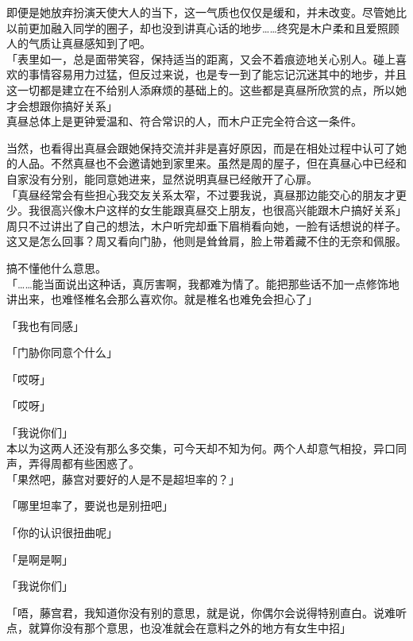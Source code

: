 即便是她放弃扮演天使大人的当下，这一气质也仅仅是缓和，并未改变。尽管她比以前更加融入同学的圈子，却也没到讲真心话的地步……终究是木户柔和且爱照顾人的气质让真昼感知到了吧。\\

「表里如一，总是面带笑容，保持适当的距离，又会不着痕迹地关心别人。碰上喜欢的事情容易用力过猛，但反过来说，也是专一到了能忘记沉迷其中的地步，并且这一切都是建立在不给别人添麻烦的基础上的。这些都是真昼所欣赏的点，所以她才会想跟你搞好关系」\\

真昼总体上是更钟爱温和、符合常识的人，而木户正完全符合这一条件。

当然，也看得出真昼会跟她保持交流并非是喜好原因，而是在相处过程中认可了她的人品。不然真昼也不会邀请她到家里来。虽然是周的屋子，但在真昼心中已经和自家没有分别，能同意她进来，显然说明真昼已经敞开了心扉。\\

「真昼经常会有些担心我交友关系太窄，不过要我说，真昼那边能交心的朋友才更少。我很高兴像木户这样的女生能跟真昼交上朋友，也很高兴能跟木户搞好关系」\\

周只不过讲出了自己的想法，木户听完却垂下眉梢看向她，一脸有话想说的样子。这又是怎么回事？周又看向门胁，他则是耸耸肩，脸上带着藏不住的无奈和佩服。

搞不懂他什么意思。\\

「……能当面说出这种话，真厉害啊，我都难为情了。能把那些话不加一点修饰地讲出来，也难怪椎名会那么喜欢你。就是椎名也难免会担心了」

「我也有同感」

「门胁你同意个什么」

「哎呀」

「哎呀」

「我说你们」\\

本以为这两人还没有那么多交集，可今天却不知为何。两个人却意气相投，异口同声，弄得周都有些困惑了。\\

「果然吧，藤宫对要好的人是不是超坦率的？」

「哪里坦率了，要说也是别扭吧」

「你的认识很扭曲呢」

「是啊是啊」

「我说你们」

「唔，藤宫君，我知道你没有别的意思，就是说，你偶尔会说得特别直白。说难听点，就算你没有那个意思，也没准就会在意料之外的地方有女生中招」

